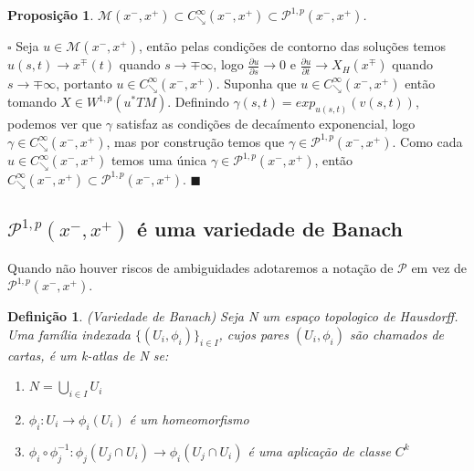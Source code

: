 \documentclass[12pt]{book}
\newtheorem{definicao}[teorema]{Definição}
\newtheorem{proposicao}[teorema]{Proposição}
\newenvironment{prova}[1]{$\square$ #1}{\hfill$\blacksquare$}
\newcommand{\aplicacaoexponencial}[2]{exp_{#1}(#2)}
\newcommand{\caminhosdecaimentoexponencial}[2]{C^{\infty}_{\searrow}(#1, #2)}
\newcommand{\caminhosdecaimentoexponencialpadrao}{\caminhosdecaimentoexponencial{x^{-}}{x^{+}}}
\newcommand{\caminhosexponenciaisconectantesabrev}{\mathcal{P}}
\newcommand{\caminhosexponenciaisconectantes}[2]{\mathcal{P}^{1,p}(#1, #2)}
\newcommand{\caminhosexponenciaisconectantespadrao}{\caminhosexponenciaisconectantes{x^{-}}{x^{+}}}
\newcommand{\derivadaparcial}[2]{\frac{\partial #1}{\partial #2}}
\newcommand{\espacosobolev}[1]{W^{1,p}(#1)}
\newcommand{\orbitasconectantespadrao}{\mathcal{M}(x^{-}, x^{+})}
\newcommand{\pullbackfibradotangente}[2]{#1^{*}T#2}
\newcommand{\pullbackfibradotangenteM}[1]{\pullbackfibradotangente{#1}{M}}
\begin{document}
	\begin{proposicao}
		$\orbitasconectantespadrao \subset \caminhosdecaimentoexponencialpadrao \subset  \caminhosexponenciaisconectantespadrao$.
	\end{proposicao}
	\begin{prova}
		Seja $u \in \orbitasconectantespadrao$, então pelas condições de contorno das soluções temos $u(s,t)  \to x^{\mp}(t)$ quando $s\to \mp \infty$, logo $\derivadaparcial{u}{s} \to 0$ e $\derivadaparcial{u}{t} \to X_{H}(x^{\mp})$ quando $s\to \mp \infty$, portanto $u \in \caminhosdecaimentoexponencialpadrao$. Suponha que $u \in \caminhosdecaimentoexponencialpadrao$ então tomando $X \in \espacosobolev{\pullbackfibradotangenteM{u}}$. Definindo $\gamma(s, t) =\aplicacaoexponencial{u(s, t)}{v(s, t)}$, podemos ver que $\gamma$ satisfaz as condições de decaímento exponencial, logo $\gamma \in \caminhosdecaimentoexponencialpadrao$, mas por construção temos que $\gamma \in \caminhosexponenciaisconectantespadrao$. Como cada $u \in \caminhosdecaimentoexponencialpadrao$ temos uma única $\gamma \in \caminhosexponenciaisconectantespadrao$, então $\caminhosdecaimentoexponencialpadrao \subset \caminhosexponenciaisconectantespadrao$. 
	\end{prova}
	
	\subsection{$\caminhosexponenciaisconectantespadrao$ é uma variedade de Banach}

	Quando não houver riscos de ambiguidades adotaremos a notação de $\caminhosexponenciaisconectantesabrev$ em vez de $\caminhosexponenciaisconectantespadrao$.

	\begin{definicao}
		(Variedade de Banach) Seja N um espaço topologico de Hausdorff. Uma família indexada $\{(U_{i}, \phi_{i})\}_{i \in I}$, cujos pares $(U_{i}, \phi_{i})$ são chamados de cartas, é um k-atlas de N se:
		\begin{enumerate}
			\item $N=\bigcup_{i\in I} U_{i}$
			\item $\phi_{i}:U_{i} \to \phi_{i}(U_{i})$ é um homeomorfismo
			\item $\phi_{i}\circ \phi_{j}^{-1}: \phi_{j}(U_{j}\cap U_{i}) \to \phi_{i}(U_{j}\cap U_{i}) $ é uma aplicação de classe $C^{k}$
		\end{enumerate}
	\end{definicao}
	
\end{document}
